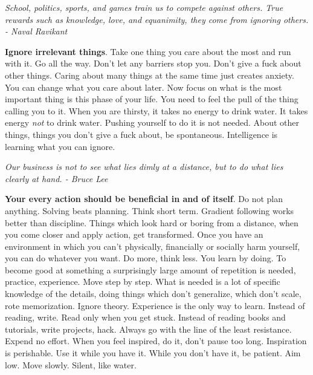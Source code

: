 \documentclass[a4paper,hidelinks]{article}
\begin{document}
\newpage

\begin{center}
\textit{School, politics, sports, and games train us to compete against others. True rewards such as knowledge, love, and equanimity, they come from ignoring others. - Naval Ravikant}
\end{center}

\textbf{Ignore irrelevant things}.
Take one thing you care about the most and run with it.
Go all the way.
Don't let any barriers stop you.
Don't give a fuck about other things.
Caring about many things at the same time just creates anxiety.
You can change what you care about later.
Now focus on what is the most important thing is this phase of your life.
You need to feel the pull of the thing calling you to it.
When you are thirsty, it takes no energy to drink water.
It takes energy \textit{not} to drink water.
Pushing yourself to do it is not needed.
About other things, things you don't give a fuck about, be spontaneous.
Intelligence is learning what you can ignore.

\newpage

\begin{center}
\textit{Our business is not to see what lies dimly at a distance, but to do what lies clearly at hand. - Bruce Lee}
\end{center}

\textbf{Your every action should be beneficial in and of itself}.
Do not plan anything.
Solving beats planning.
Think short term.
Gradient following works better than discipline.
Things which look hard or boring from a distance, when you come closer and apply action, get transformed.
Once you have an environment in which you can't physically, financially or socially harm yourself, you can do whatever you want.
Do more, think less.
You learn by doing.
To become good at something a surprisingly large amount of repetition is needed, practice, experience.
Move step by step.
What is needed is a lot of specific knowledge of the details, doing things which don't generalize, which don't scale, rote memorization.
Ignore theory.
Experience is the only way to learn.
Instead of reading, write.
Read only when you get stuck.
Instead of reading books and tutorials, write projects, hack.
Always go with the line of the least resistance.
Expend no effort.
When you feel inspired, do it, don't pause too long.
Inspiration is perishable.
Use it while you have it.
While you don't have it, be patient.
Aim low.
Move slowly.
Silent, like water.

\newpage
\end{document}
